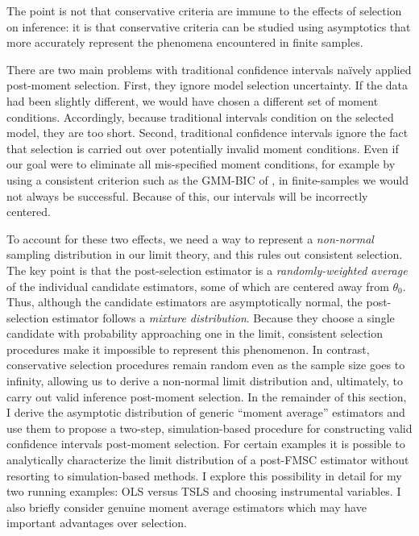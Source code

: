 The point is not that conservative criteria are immune to the effects of selection on inference: it is that conservative criteria can be studied using asymptotics that more accurately represent the phenomena encountered in finite samples.

There are two main problems with traditional confidence intervals na\"{i}vely applied post-moment selection.
First, they ignore model selection uncertainty.
If the data had been slightly different, we would have chosen a different set of moment conditions.
Accordingly, because traditional intervals condition on the selected model, they are too short.
Second, traditional confidence intervals ignore the fact that selection is carried out over potentially invalid moment conditions.
Even if our goal were to eliminate all mis-specified moment conditions, for example by using a consistent criterion such as the GMM-BIC of \cite{Andrews1999}, in finite-samples we would not always be successful.
Because of this, our intervals will be incorrectly centered.

To account for these two effects, we need a way to represent a \emph{non-normal} sampling distribution in our limit theory, and this rules out consistent selection.
The key point is that the post-selection estimator is a \emph{randomly-weighted average} of the individual candidate estimators, some of which are centered away from $\theta_0$.
Thus, although the candidate estimators are asymptotically normal, the post-selection estimator follows a \emph{mixture distribution}.
Because they choose a single candidate with probability approaching one in the limit, consistent selection procedures make it impossible to represent this phenomenon.
In contrast, conservative selection procedures remain random even as the sample size goes to infinity, allowing us to derive a non-normal limit distribution and, ultimately, to carry out valid inference post-moment selection.
In the remainder of this section, I derive the asymptotic distribution of generic ``moment average'' estimators and use them to propose a two-step, simulation-based procedure for constructing valid confidence intervals post-moment selection.
For certain examples it is possible to analytically characterize the limit distribution of a post-FMSC estimator without resorting to simulation-based methods.
I explore this possibility in detail for my two running examples: OLS versus TSLS and choosing instrumental variables.
I also briefly consider genuine moment average estimators which may have important advantages over selection.

